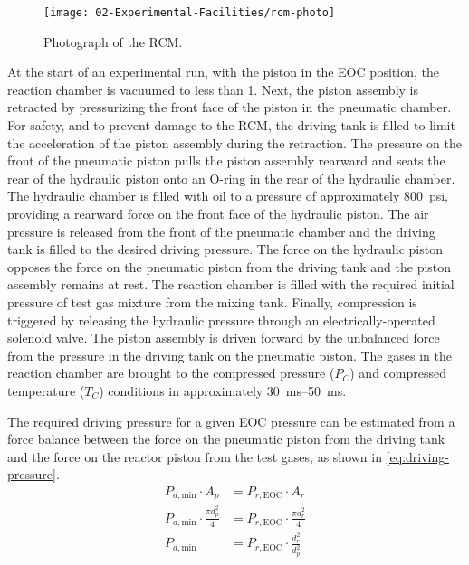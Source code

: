 \documentclass[../main.tex]{subfiles}
\begin{document}

\begin{figure}
\texttt{[image: 02-Experimental-Facilities/rcm-photo]}
\caption{Photograph of the RCM.}\label{fig:rcm-photo}
\end{figure}

At the start of an experimental run, with the piston in the
EOC position, the reaction chamber is vacuumed to less
than \SI{1}{\torr}. Next, the piston assembly is retracted by pressurizing
the front face of the piston in the pneumatic chamber.
For safety, and to prevent damage to the RCM, the driving tank is
filled to limit the acceleration of the piston assembly during the
retraction.
The pressure on the front of the pneumatic piston pulls the
piston assembly rearward and seats the rear of the
hydraulic piston onto an O-ring in the rear of the
hydraulic chamber. The hydraulic chamber is filled with oil to
a pressure of approximately \SI{800}{psi}, providing a rearward force on the
front face of the hydraulic piston. The air pressure is released from
the front of the pneumatic chamber and the driving tank is filled to
the desired driving pressure. The
force on the hydraulic piston opposes the force on the pneumatic piston
from the driving tank and the piston assembly remains at rest. The
reaction chamber is filled with the required initial pressure of test
gas mixture from the mixing tank. Finally, compression is triggered by
releasing the hydraulic pressure through an electrically-operated solenoid
valve. The piston assembly is driven forward by the unbalanced force from
the pressure in the driving tank on the pneumatic piston. The gases
in the reaction chamber are brought to the compressed pressure ($P_C$) and
compressed temperature ($T_C$) conditions in approximately
\SIrange{30}{50}{\milli\second}.

The required driving pressure for a given EOC pressure can be estimated
from a force balance between the force on the pneumatic piston from the
driving tank and the force on the reactor piston from the test gases,
as shown in \cref{eq:driving-pressure}.
%
\begin{subequations}
\label{eq:piston-force}
\begin{align}
    P_{d,\text{min}} \cdot A_p &= P_{r,\text{EOC}} \cdot A_r \\
    P_{d,\text{min}} \cdot \frac{\pi d_p^2}{4} &= P_{r,\text{EOC}} \cdot \frac{\pi d_r^2}{4} \\
    P_{d,\text{min}} &= P_{r,\text{EOC}} \cdot \frac{d_r^2}{d_p^2} \label{eq:driving-pressure}
\end{align}
\end{subequations}
\end{document}
